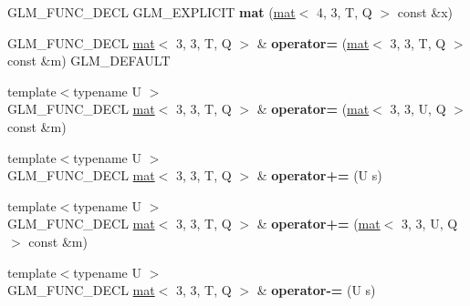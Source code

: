 \begin{DoxyCompactItemize}
G\+L\+M\+\_\+\+F\+U\+N\+C\+\_\+\+D\+E\+CL G\+L\+M\+\_\+\+E\+X\+P\+L\+I\+C\+IT {\bfseries mat} (\hyperlink{structglm_1_1mat}{mat}$<$ 4, 3, T, Q $>$ const \&x)
\item 
\mbox{\label{structglm_1_1mat_3_013_00_013_00_01T_00_01Q_01_4_a78f72855201a8b7fe3b2cc33cead57ad}} 
G\+L\+M\+\_\+\+F\+U\+N\+C\+\_\+\+D\+E\+CL \hyperlink{structglm_1_1mat}{mat}$<$ 3, 3, T, Q $>$ \& {\bfseries operator=} (\hyperlink{structglm_1_1mat}{mat}$<$ 3, 3, T, Q $>$ const \&m) G\+L\+M\+\_\+\+D\+E\+F\+A\+U\+LT
\item 
\mbox{\label{structglm_1_1mat_3_013_00_013_00_01T_00_01Q_01_4_a99d653079ec51c82d6d715db329c84c0}} 
{\footnotesize template$<$typename U $>$ }\\G\+L\+M\+\_\+\+F\+U\+N\+C\+\_\+\+D\+E\+CL \hyperlink{structglm_1_1mat}{mat}$<$ 3, 3, T, Q $>$ \& {\bfseries operator=} (\hyperlink{structglm_1_1mat}{mat}$<$ 3, 3, U, Q $>$ const \&m)
\item 
\mbox{\label{structglm_1_1mat_3_013_00_013_00_01T_00_01Q_01_4_abf9da018243788a6fe452e4bdf18526d}} 
{\footnotesize template$<$typename U $>$ }\\G\+L\+M\+\_\+\+F\+U\+N\+C\+\_\+\+D\+E\+CL \hyperlink{structglm_1_1mat}{mat}$<$ 3, 3, T, Q $>$ \& {\bfseries operator+=} (U s)
\item 
\mbox{\label{structglm_1_1mat_3_013_00_013_00_01T_00_01Q_01_4_a52cc749283b195a2ad28964519032bd4}} 
{\footnotesize template$<$typename U $>$ }\\G\+L\+M\+\_\+\+F\+U\+N\+C\+\_\+\+D\+E\+CL \hyperlink{structglm_1_1mat}{mat}$<$ 3, 3, T, Q $>$ \& {\bfseries operator+=} (\hyperlink{structglm_1_1mat}{mat}$<$ 3, 3, U, Q $>$ const \&m)
\item 
\mbox{\label{structglm_1_1mat_3_013_00_013_00_01T_00_01Q_01_4_aed487ca4202482113e6399e7c63e2707}} 
{\footnotesize template$<$typename U $>$ }\\G\+L\+M\+\_\+\+F\+U\+N\+C\+\_\+\+D\+E\+CL \hyperlink{structglm_1_1mat}{mat}$<$ 3, 3, T, Q $>$ \& {\bfseries operator-\/=} (U s)
\item 
\mbox{\label{structglm_1_1mat_3_013_00_013_00_01T_00_01Q_01_4_a9774d11e0033307ef6b4161b7cad2984}} 

\end{DoxyCompactItemize}
